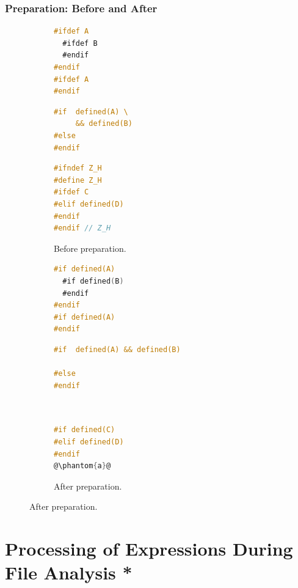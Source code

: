 \documentclass{beamer}
\begin{document}
\begin{frame}[fragile]
\frametitle{Preparation: Before and After}


\begin{figure}[ht]
        \centering
        \small
        \begin{subfigure}[b]{0.4\textwidth}
					\begin{lstlisting}[language=C]
#ifdef A
  #ifdef B
  #endif
#endif
#ifdef A
#endif
					\end{lstlisting}
					\begin{lstlisting}[language=C, firstnumber=5]
#if  defined(A) \
     && defined(B)
#else 
#endif
					\end{lstlisting}
					\begin{lstlisting}[language=C, firstnumber=8]
#ifndef Z_H
#define Z_H
#ifdef C
#elif defined(D)
#endif
#endif // Z_H
					\end{lstlisting}
					\caption{\scriptsize Before preparation.}
        \end{subfigure}   
        \hfill
        \begin{subfigure}[b]{0.4\textwidth}
					\begin{lstlisting}[language=C]
#if defined(A)
  #if defined(B)
  #endif
#endif
#if defined(A)
#endif
					\end{lstlisting}
					\begin{lstlisting}[language=C, firstnumber=5]
#if  defined(A) && defined(B)

#else 
#endif
					\end{lstlisting}
					\begin{lstlisting}[language=C, firstnumber=8]


#if defined(C)
#elif defined(D)
#endif
@\phantom{a}@
					\end{lstlisting}
					\caption{\scriptsize After preparation.}
        \end{subfigure}         
        
        \label{fig:examples2_5}
\end{figure}

\end{frame}


\section[Processing *]{Processing of Expressions During File Analysis *}
\stepcounter{subsection}
\end{document}
